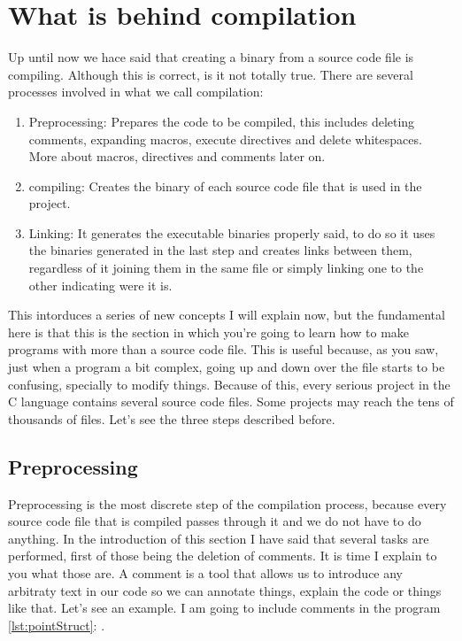 \documentclass[a4paper]{article}
\begin{document}
\section{What is behind compilation}
Up until now we hace said that creating a binary from a source code file is
compiling. Although this is correct, is it not totally true. There are several
processes involved in what we call compilation:
\begin{enumerate}
\item Preprocessing: Prepares the code to be compiled, this includes deleting
comments, expanding macros, execute directives and delete whitespaces. More
about macros, directives and comments later on.
\item compiling: Creates the binary of each source code file that is used in
the project.
\item Linking: It generates the executable binaries properly said, to do so it
uses the binaries generated in the last step and creates links between them,
regardless of it joining them in the same file or simply linking one to the
other indicating were it is.
\end{enumerate}

This intorduces a series of new concepts I will explain now, but the fundamental
here is that this is the section in which you're going to learn how to make
programs with more than a source code file. This is useful because, as you saw,
just when a program a bit complex, going up and down over the file starts to be
confusing, specially to modify things. Because of this, every serious project
in the C language contains several source code files. Some projects may reach
the tens of thousands of files. Let's see the three steps described before.

\subsection{Preprocessing}
Preprocessing is the most discrete step of the compilation process, because
every source code file that is compiled passes through it and we do not have to
do anything. In the introduction of this section I have said that several tasks
are performed, first of those being the deletion of comments. It is time I
explain to you what those are. A comment is a tool that allows us to introduce
any arbitraty text in our code so we can annotate things, explain the code or
things like that. Let's see an example. I am going to include comments in the
program \ref {lst:pointStruct}: .
\end{document}
